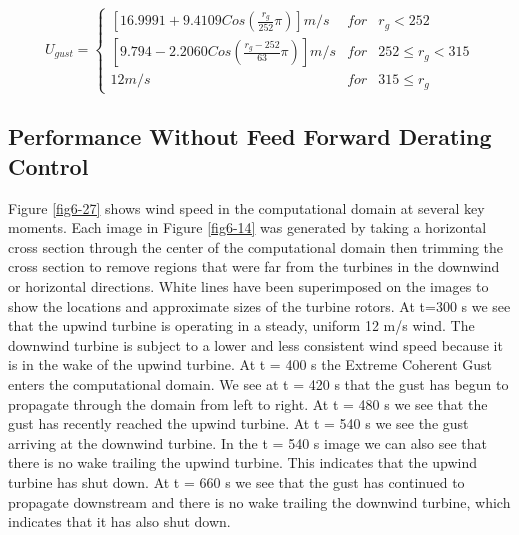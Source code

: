 \begin{equation} \label{eq6-4}
	U_{gust}=\left\{\begin{matrix}
\left [16.9991 +9.4109Cos\left ( \frac{r_g}{252 }\pi  \right )  \right ]m/s & for  & r_g<252\\ 
 \left [9.794 -2.2060Cos\left ( \frac{r_g-252}{63}\pi  \right )  \right ]m/s & for  & 252 \leq r_g <315\\ 
 12 m/s &  for & 315 \leq r_g
\end{matrix}\right. 
\end{equation}

\subsection{Performance Without Feed Forward Derating Control} \label{section6-7-2}

Figure \ref{fig6-27} shows wind speed in the computational domain at several key moments. Each image in Figure \ref{fig6-14} was generated by taking a horizontal cross section through the center of the computational domain then trimming the cross section to remove regions that were far from the turbines in the downwind or horizontal directions. White lines have been superimposed on the images to show the locations and approximate sizes of the turbine rotors. At t=300 s we see that the upwind turbine is operating in a steady, uniform 12 m/s wind. The downwind turbine is subject to a lower and less consistent wind speed because it is in the wake of the upwind turbine. At t = 400 s the Extreme Coherent Gust enters the computational domain. We see at t = 420 s that the gust has begun to propagate through the domain from left to right. At t = 480 s we see that the gust has recently reached the upwind turbine. At t = 540 s we see the gust arriving at the downwind turbine. In the t = 540 s image we can also see that there is no wake trailing the upwind turbine. This indicates that the upwind turbine has shut down. At t = 660 s we see that the gust has continued to propagate downstream and there is no wake trailing the downwind turbine, which indicates that it has also shut down.

